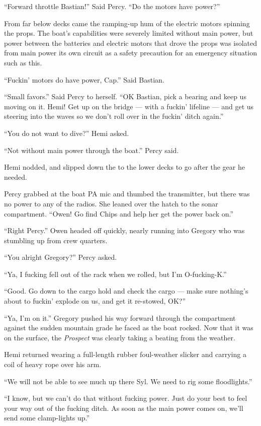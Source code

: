 \documentclass[]{scrbook}
\begin{document}
``Forward throttle Bastian!'' Said Percy. ``Do the motors have power?''

From far below decks came the ramping-up hum of the electric motors
spinning the props. The boat's capabilities were severely limited
without main power, but power between the batteries and electric motors
that drove the props was isolated from main power its own circuit as a
safety precaution for an emergency situation such as this.

``Fuckin' motors do have power, Cap.'' Said Bastian.

``Small favors.'' Said Percy to herself. ``OK Bastian, pick a bearing
and keep us moving on it. Hemi! Get up on the bridge --- with a fuckin'
lifeline --- and get us steering into the waves so we don't roll over in
the fuckin' ditch again.''

``You do not want to dive?'' Hemi asked.

``Not without main power through the boat.'' Percy said.

Hemi nodded, and slipped down the to the lower decks to go after the
gear he needed.

Percy grabbed at the boat PA mic and thumbed the transmitter, but there
was no power to any of the radios. She leaned over the hatch to the
sonar compartment. ``Owen! Go find Chips and help her get the power back
on.''

``Right Percy.'' Owen headed off quickly, nearly running into Gregory
who was stumbling up from crew quarters.

``You alright Gregory?'' Percy asked.

``Ya, I fucking fell out of the rack when we rolled, but I'm
O-fucking-K.''

``Good. Go down to the cargo hold and check the cargo --- make sure
nothing's about to fuckin' explode on us, and get it re-stowed, OK?''

``Ya, I'm on it.'' Gregory pushed his way forward through the
compartment against the sudden mountain grade he faced as the boat
rocked. Now that it was on the surface, the \emph{Prospect} was clearly
taking a beating from the weather.

Hemi returned wearing a full-length rubber foul-weather slicker and
carrying a coil of heavy rope over his arm.

``We will not be able to see much up there Syl. We need to rig some
floodlights.''

``I know, but we can't do that without fucking power. Just do your best
to feel your way out of the fucking ditch. As soon as the main power
comes on, we'll send some clamp-lights up.''
\end{document}
